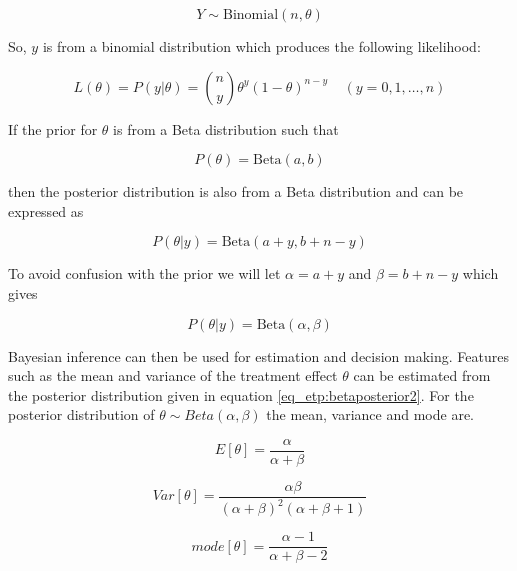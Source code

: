 \begin{equation}
	Y \sim \text{Binomial}(n, \theta)
\end{equation}

So, $y$ is from a binomial distribution which produces the following likelihood: 

\begin{equation}
	L(\theta) = P(y|\theta) = {n \choose y}\theta^y (1-\theta)^{n-y} \; \; \; \; (y = 0,1,\ldots,n)
\end{equation}

If the prior for $\theta$ is from a Beta distribution such that 

\begin{equation}
	\label{eq_etp:betaprior}
	P(\theta) = \text{Beta}(a,b)
\end{equation}

then the posterior distribution is also from a Beta distribution and can be expressed as 

\begin{equation}
\label{eq_etp:betaposterior}
	P(\theta|y) = \text{Beta}(a+y,b+n-y)
\end{equation}

To avoid confusion with the prior we will let $\alpha = a+y$ and $\beta = b+n-y$ which gives

\begin{equation}
	\label{eq_etp:betaposterior2}
	P(\theta|y) = \text{Beta}(\alpha,\beta)
\end{equation}

Bayesian inference can then be used for estimation and decision making. Features such as the mean and  variance of the treatment effect $\theta$ can be  estimated from the posterior distribution given in equation \ref{eq_etp:betaposterior2}. For the posterior distribution of $\theta \sim Beta(\alpha,\beta)$ the mean, variance and mode are.

\begin{equation}
\label{eq_etp:betamean}
	E[\theta] = \frac{\alpha}{\alpha + \beta} 
\end{equation}

\begin{equation}
\label{eq_etp:betavar}
	Var[\theta] = \frac{\alpha\beta}{(\alpha+\beta)^2 (\alpha+\beta+1)}
\end{equation}

\begin{equation}
	\label{eq_etp:betamode}
	mode[\theta] = \frac{\alpha - 1 }{\alpha + \beta - 2} 
\end{equation}
 

